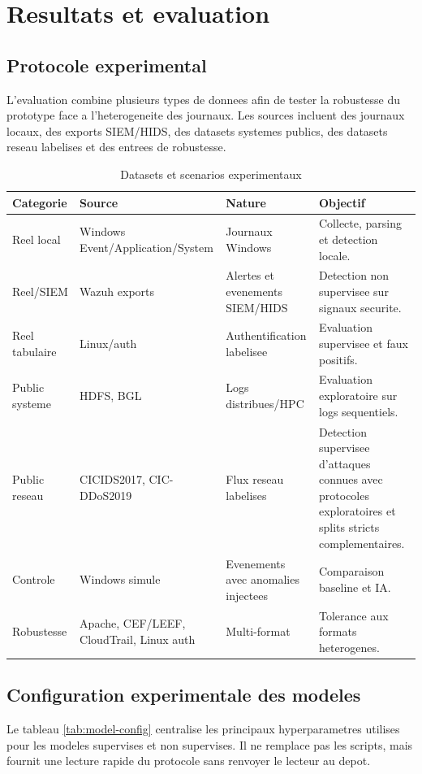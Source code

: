 \chapter{Resultats et evaluation}
\label{chap:resultats}

\section{Protocole experimental}
L'evaluation combine plusieurs types de donnees afin de tester la robustesse du prototype face a l'heterogeneite des journaux. Les sources incluent des journaux locaux, des exports SIEM/HIDS, des datasets systemes publics, des datasets reseau labelises et des entrees de robustesse.

\begin{table}[H]
\centering
\caption{Datasets et scenarios experimentaux}
\label{tab:datasets}
\scriptsize
\begin{tabularx}{\textwidth}{p{2.4cm}p{3.2cm}p{3cm}X}
\toprule
\textbf{Categorie} & \textbf{Source} & \textbf{Nature} & \textbf{Objectif} \\
\midrule
Reel local & Windows Event/Application/System & Journaux Windows & Collecte, parsing et detection locale. \\
Reel/SIEM & Wazuh exports & Alertes et evenements SIEM/HIDS & Detection non supervisee sur signaux securite. \\
Reel tabulaire & Linux/auth & Authentification labelisee & Evaluation supervisee et faux positifs. \\
Public systeme & HDFS, BGL & Logs distribues/HPC & Evaluation exploratoire sur logs sequentiels. \\
Public reseau & CICIDS2017, CIC-DDoS2019 & Flux reseau labelises & Detection supervisee d'attaques connues avec protocoles exploratoires et splits stricts complementaires. \\
Controle & Windows simule & Evenements avec anomalies injectees & Comparaison baseline et IA. \\
Robustesse & Apache, CEF/LEEF, CloudTrail, Linux auth & Multi-format & Tolerance aux formats heterogenes. \\
\bottomrule
\end{tabularx}
\end{table}

\section{Configuration experimentale des modeles}
Le tableau \ref{tab:model-config} centralise les principaux hyperparametres utilises pour les modeles supervises et non supervises. Il ne remplace pas les scripts, mais fournit une lecture rapide du protocole sans renvoyer le lecteur au depot.

